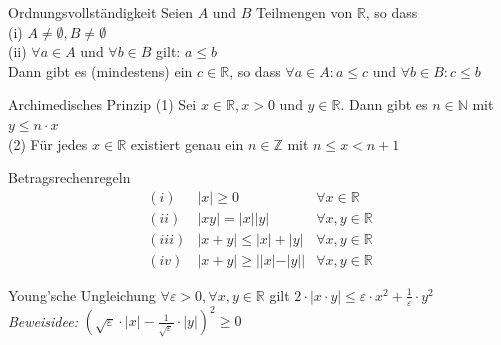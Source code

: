 \documentclass[a4paper,fontsize = 7pt]{scrartcl}
\renewcommand*{\arraystretch}{2}
\def\R{\mathbb{R}}
\begin{document}
\begin{mainbox}{Ordnungsvollständigkeit}
  \vspace{-4pt}
  Seien $A$ und $B$ Teilmengen von $\R$, so dass \\
  (i) $A \neq \emptyset, B \neq \emptyset$\\
  (ii) $\forall a \in A$ und $\forall b \in B$ gilt: $a \leq b$\\
  Dann gibt es (mindestens) ein $c \in \R$, so dass $\forall a \in A: a \leq c$ und $\forall b \in B: c \leq b$
  \vspace{-4pt}
\end{mainbox}

\begin{mainbox}{Archimedisches Prinzip}
  \vspace{-4pt}
  (1) Sei $x \in \R, x > 0$ und $y \in \R$. Dann gibt es $n \in \mathbb{N}$ mit $y \leq n \cdot x$ \\
  (2) Für jedes $x \in \R$ existiert genau ein $n \in \mathbb{Z}$ mit $n \leq x < n+1$
  \vspace{-4pt}
\end{mainbox}

\arraycolsep=0pt\def\arraystretch{1}
\begin{subbox}{Betragsrechenregeln}
  \vspace{-6pt}
  \begin{equation*}
      \begin{array}{rcl}
          (i) & |x| \geq 0 & \forall x \in \R\\
          (ii) & |xy| = |x||y| & \forall x,y \in \R\\
          (iii) & |x+y| \leq |x| + |y| & \forall x,y \in \R\\
          (iv) & |x+y| \geq ||x| - |y|| & \forall x,y \in \R
      \end{array}
  \end{equation*}
  \vspace{-10pt}
\end{subbox}

\begin{subbox}{Young'sche Ungleichung}
  \vspace{-4pt}
  $\forall \varepsilon>0, \forall x, y \in \R$ gilt $2 \cdot |x \cdot y| \leq \varepsilon \cdot x^2 + \frac{1}{\varepsilon} \cdot y^2$ 
  \\ \textit{Beweisidee:} $(\sqrt{\varepsilon}\cdot |x| - \frac{1}{\sqrt{\varepsilon}} \cdot |y|)^2 \geq 0$ 
  \vspace{-4pt}
\end{subbox}
\end{document}
